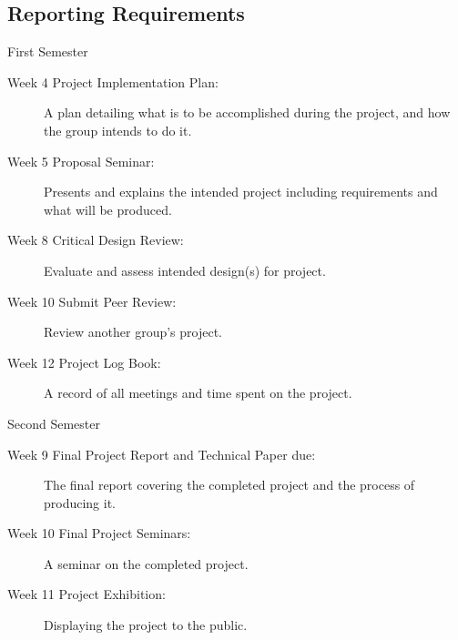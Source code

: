 \documentclass[a4paper,12pt]{article}
\begin{document}
\subsection{Reporting Requirements}

First Semester
\begin{description}
\item[Week 4 Project Implementation Plan:] A plan detailing what is to
  be accomplished during the project, and how the group intends to do
  it.
\item[Week 5 Proposal Seminar:] Presents and explains the intended
  project including requirements and what will be produced.
\item[Week 8 Critical Design Review:] Evaluate and assess intended
  design(s) for project.
\item[Week 10 Submit Peer Review:] Review another group's project.
\item[Week 12 Project Log Book:] A record of all meetings and time
  spent on the project.
\end{description}

Second Semester
\begin{description}
\item[Week 9 Final Project Report and Technical Paper due:] The final
report covering the completed project and the process of producing it.
\item[Week 10 Final Project Seminars:] A seminar on the completed
project.  
\item[Week 11 Project Exhibition:] Displaying the project to the
public.
\end{description}

%













\end{document}
